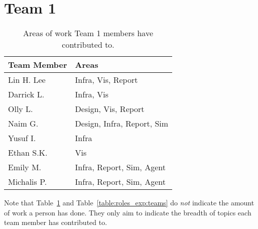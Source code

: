 \section{Team 1}
\label{sec:roles_appendix:team1}

\begin{table}[H]
    \centering
    \begin{tabular}{|l|l|}
    \hline
    \textbf{Team Member} & \textbf{Areas}     \\ \hline
    Lin H. Lee  & Infra, Vis, Report         \\
    Darrick L.  & Infra, Vis                 \\
    Olly L.     & Design, Vis, Report        \\
    Naim G.     & Design, Infra, Report, Sim \\
    Yusuf I.    & Infra                      \\
    Ethan S.K.  & Vis                        \\
    Emily M.    & Infra, Report, Sim, Agent  \\
    Michalis P. & Infra, Report, Sim, Agent  \\ \hline
\end{tabular}
\caption{Areas of work Team 1 members have contributed to.}
\label{table:roles_appendix:team1}
\end{table}



Note that Table~\ref{table:roles_appendix:team1} and Table~\ref{table:roles_exp:teams} do \emph{not} indicate the amount of work a person has done. They only aim to indicate the breadth of topics each team member has contributed to.